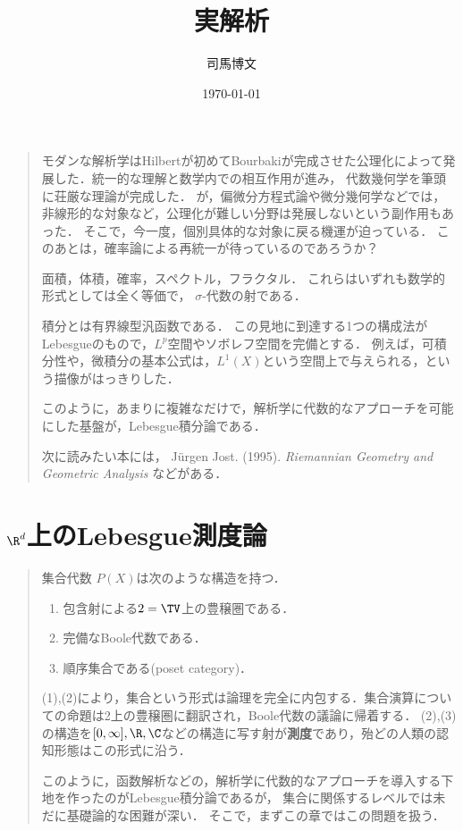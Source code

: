 \documentclass[uplatex, dvipdfmx]{jsreport}
\title{実解析}
\author{司馬博文}
\date{\today}
\begin{document}
\tableofcontents

\begin{quotation}
    モダンな解析学はHilbertが初めてBourbakiが完成させた公理化によって発展した．統一的な理解と数学内での相互作用が進み，
    代数幾何学を筆頭に荘厳な理論が完成した．
    が，偏微分方程式論や微分幾何学などでは，非線形的な対象など，公理化が難しい分野は発展しないという副作用もあった．
    そこで，今一度，個別具体的な対象に戻る機運が迫っている．
    このあとは，確率論による再統一が待っているのであろうか？

    面積，体積，確率，スペクトル，フラクタル．
    これらはいずれも数学的形式としては全く等価で，
    $\sigma$-代数の射である．

    積分とは有界線型汎函数である．
    この見地に到達する1つの構成法がLebesgueのもので，$L^p$空間やソボレフ空間を完備とする．
    例えば，可積分性や，微積分の基本公式は，$L^1(X)$という空間上で与えられる，という描像がはっきりした．

    このように，あまりに複雑なだけで，解析学に代数的なアプローチを可能にした基盤が，Lebesgue積分論である．

    次に読みたい本には，
    Jürgen Jost. (1995). \textit{Riemannian Geometry and Geometric Analysis}
    などがある．
\end{quotation}

\chapter{$\R^d$上のLebesgue測度論}

\begin{quotation}
    集合代数
    $P(X)$は次のような構造を持つ．
    \begin{enumerate}
        \item 包含射による$2=\TV$上の豊穣圏である．
        \item 完備なBoole代数である．
        \item 順序集合である(poset category)．
    \end{enumerate}
    (1),(2)により，集合という形式は論理を完全に内包する．集合演算についての命題は2上の豊穣圏に翻訳され，Boole代数の議論に帰着する．
    (2),(3)の構造を$[0,\infty],\R,\C$などの構造に写す射が\textbf{測度}であり，殆どの人類の認知形態はこの形式に沿う．

    このように，函数解析などの，解析学に代数的なアプローチを導入する下地を作ったのがLebesgue積分論であるが，
    集合に関係するレベルでは未だに基礎論的な困難が深い．
    そこで，まずこの章ではこの問題を扱う．
\end{quotation}
\end{document}
